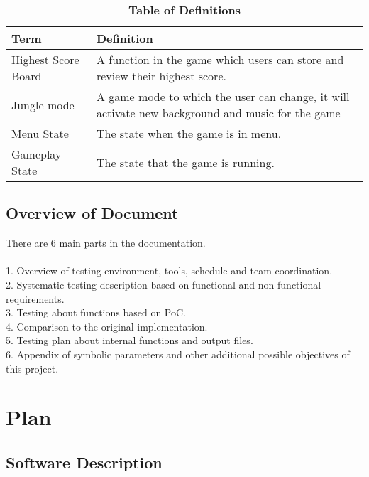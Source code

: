 \documentclass[12pt, titlepage]{article}
\begin{document}
\begin{table}[!htbp]
\caption{\textbf{Table of Definitions}} \label{Table}

\begin{tabularx}{\textwidth}{p{3cm}X}
\toprule
\textbf{Term} & \textbf{Definition}\\
\midrule
Highest Score Board & A function in the game which users can store and review their highest score.\\
Jungle mode & A game mode to which the user can change, it will activate new background and music for the game\\
Menu State & The state when the game is in menu.\\
Gameplay State & The state that the game is running.\\
\bottomrule
\end{tabularx}

\end{table}	

\subsection{Overview of Document}
 There are 6 main parts in the documentation.\\\\
  1. Overview of testing environment, tools, schedule and team coordination.\\
  2. Systematic testing description based on functional and non-functional requirements.\\
  3. Testing about functions based on PoC.\\
  4. Comparison to the original implementation.\\
  5. Testing plan about internal functions and output files.\\
  6. Appendix of symbolic parameters and other additional possible objectives of this project.\\
\section{Plan}
	
\subsection{Software Description}
\end{document}
